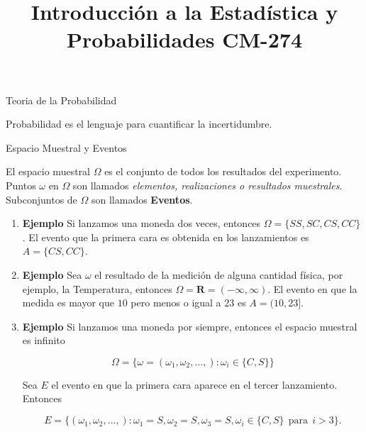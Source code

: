 \documentclass{article}\usepackage[]{graphicx}\usepackage[]{color}
\begin{document}
\title{Introducci\'on a la Estad\'istica y Probabilidades CM-274}
\date{}
\maketitle

\vspace{0.3cm}

{\Large Teoria de la Probabilidad }



\vspace{0.8cm}

Probabilidad es el lenguaje para cuantificar la incertidumbre.

\vspace{0.5cm}

{\large Espacio Muestral y Eventos}

\vspace{0.3cm}


El espacio muestral $\Omega$ es el conjunto de todos los resultados del experimento. Puntos $\omega$ en $\Omega$ son llamados \textit{elementos, realizaciones o resultados muestrales}. Subconjuntos de $\Omega$ son llamados \textbf{Eventos}.

\vspace{0.3cm}

\begin{enumerate}

\item \textbf{Ejemplo} Si lanzamos una moneda dos veces, entonces $\Omega = \{SS, SC,CS,CC\}$. El evento que la primera cara es obtenida en los lanzamientos es $A = \{ CS,CC\}$.


\item \textbf{Ejemplo} Sea $\omega$ el resultado de la medici\'on de alguna cantidad f\'isica, por ejemplo, la Temperatura, entonces $\Omega = \mathbf{R} = ( -\infty, \infty)$. El evento en que la medida es mayor que $10$ pero menos o igual a $23$ es $A =(10, 23]$.


\item \textbf{Ejemplo} Si lanzamos una moneda por siempre, entonces el espacio muestral es infinito

\[
\Omega = \{ \omega = (\omega_1, \omega_2, \dots, ):\omega_{i} \in \{C,S \} \}
\]

Sea $E$ el evento en que la primera cara aparece en el tercer lanzamiento. Entonces

\[
E = \{(\omega_1, \omega_2, \dots, ) : \omega_1 = S, \omega_2 = S, \omega_3 = S, \omega_{i} \in  \{ C, S\} \ \ \mbox{para} \ \  i > 3 \}.
\]
\end{enumerate}
\end{document}
